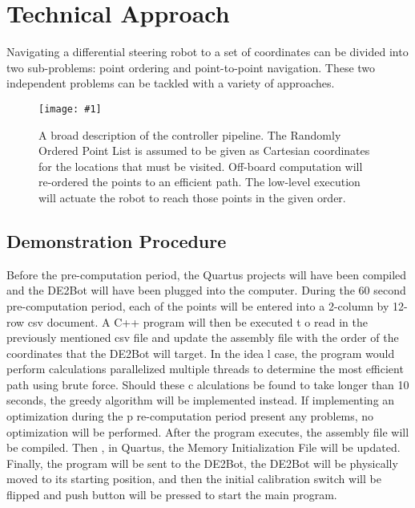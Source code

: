 \documentclass[12pt,conference,onecolumn]{article} %
\newcommand{\myfigure}[4]{
  \begin{figure}[h!]
      \centering
      \texttt{[image: \#1]}
      \caption{#2}
\label{#4}
    \end{figure}
}
\begin{document}
\section*{Technical Approach}

Navigating a differential steering robot to a set of coordinates can be divided into two sub-problems: point ordering and point-to-point navigation. These two independent problems can be tackled with a variety of approaches.

\myfigure{images/Pipeline.jpg}{A broad description of the controller pipeline. The Randomly Ordered Point List is assumed to be given as Cartesian coordinates for the locations that must be visited. Off-board computation will re-ordered the points to an efficient path. The low-level execution will actuate the robot to reach those points in the given order.}{0.5}{fig:pipeline}
\subsection*{Demonstration Procedure}
Before the pre-computation period, the Quartus projects will have been compiled and the DE2Bot will have been plugged into the computer. During the    60 second pre-computation period, each of the points will be entered into a 2-column by 12-row csv document. A C++ program will then be executed t   o read in the previously mentioned csv file and update the assembly file with the order of the coordinates that the DE2Bot will target. In the idea   l case, the program would perform calculations parallelized multiple threads to determine the most efficient path using brute force. Should these c   alculations be found to take longer than 10 seconds, the greedy algorithm will be implemented instead. If implementing an optimization during the p   re-computation period present any problems, no optimization will be performed. After the program executes, the assembly file will be compiled. Then   , in Quartus, the Memory Initialization File will be updated. Finally, the program will be sent to the DE2Bot, the DE2Bot will be physically moved    to its starting position, and then the initial calibration switch will be flipped and push button will be pressed to start the main program.
\end{document}
